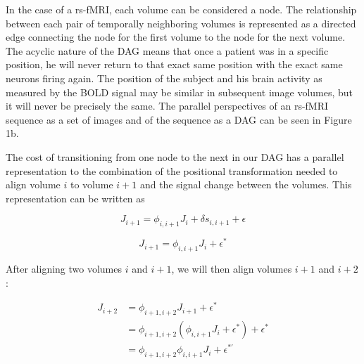 In the case of a rs-fMRI, each volume can be considered a node. The relationship between each pair of temporally neighboring volumes is represented as a directed edge connecting the node for the first volume to the node for the next volume. The acyclic nature of the DAG means that once a patient was in a specific position, he will never return to that exact same position with the exact same neurons firing again. The position of the subject and his brain activity as measured by the BOLD signal may be similar in subsequent image volumes, but it will never be precisely the same. The parallel perspectives of an rs-fMRI sequence as a set of images and of the sequence as a DAG can be seen in Figure 1b.

The cost of transitioning from one node to the next in our DAG has a parallel representation to the combination of the positional transformation needed to align volume $i$ to volume $i+1$ and the signal change between the volumes. This representation can be written as 

\begin{equation}
J_{i+1} = \phi_{i,i+1} J_i + \delta s_{i,i+1} + \epsilon
\end{equation}


\begin{equation}
J_{i+1} = \phi_{i,i+1} J_i + \epsilon^*
\end{equation}


After aligning two volumes $i$ and $i+1$, we will then align volumes $i+1$ and $i+2$:

\begin{equation}
\begin{split}
J_{i+2} &= \phi_{i+1,i+2} J_{i+1} + \epsilon^* \\
&= \phi_{i+1,i+2} (\phi_{i,i+1} J_i + \epsilon^*) +\epsilon^*\\
&= \phi_{i+1,i+2} \phi_{i,i+1} J_i + \epsilon^{*'}\\
\end{split}
\end{equation}

